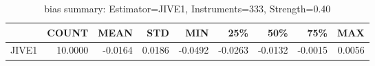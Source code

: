 \begin{table}[ht]
\centering
\caption{bias summary: Estimator=JIVE1, Instruments=333, Strength=0.40}
\begin{tabular}{lrrrrrrrr}
\toprule
 & COUNT & MEAN & STD & MIN & 25\% & 50\% & 75\% & MAX \\
\midrule
JIVE1 & 10.0000 & -0.0164 & 0.0186 & -0.0492 & -0.0263 & -0.0132 & -0.0015 & 0.0056 \\
\bottomrule
\end{tabular}
\end{table}
